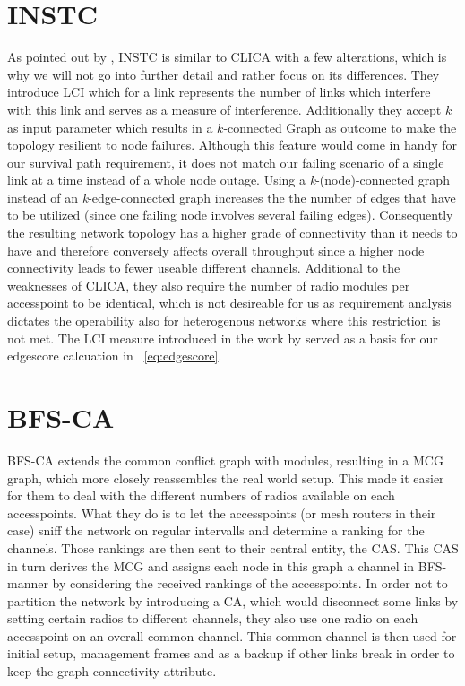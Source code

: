   \section{\ac{INSTC}}
    As pointed out by \cite{overview_caa}, INSTC \cite{INSTC} is similar to \ac{CLICA} with a few alterations, 
    which is why we will not go into further detail and rather focus on its differences. 
    They introduce \ac{LCI} which for a link represents the number of links which interfere with this link \cite{overview_caa} and serves as a measure of 
    interference. Additionally they accept \(k\) as input parameter which results in a \(k\)-connected Graph as outcome to make the topology resilient to node failures.
    Although this feature would come in handy for our survival path requirement, it does not match our failing scenario of a single link at a time instead of a whole node outage.
    Using a \textit{k}-(node)-connected graph instead of an \textit{k}-edge-connected graph increases the the number of edges that have to be utilized 
    (since one failing node involves several failing edges). Consequently the resulting network topology has a higher grade of connectivity than it needs to 
    have and therefore conversely affects overall throughput since a higher node connectivity leads to fewer useable different channels. 
    Additional to the weaknesses of \ac{CLICA}, they also require the number of radio modules per accesspoint to be identical, 
    which is not desireable for us as requirement analysis dictates the operability also for heterogenous networks where this
    restriction is not met. The LCI measure introduced in the work by \cite{INSTC} served as a basis for our edgescore calcuation in ~\ref{eq:edgescore}.
    
  \section{\ac{BFS-CA}}
    \ac{BFS-CA} \cite{BFS-CA} extends the common conflict graph with modules, resulting in a \ac{MCG} graph, which more closely reassembles the
    real world setup. This made it easier for them to deal with the different numbers of radios available on each accesspoints. 
    What they do is to let the accesspoints (or mesh routers in their case) sniff the network on regular intervalls and determine a ranking for the channels.
    Those rankings are then sent to their central entity, the \ac{CAS}. This \ac{CAS} in turn derives the \ac{MCG} and assigns each node in this graph 
    a channel in \ac{BFS}-manner by considering the received rankings of the accesspoints. In order not to partition the network by introducing a \ac{CA}, which 
    would disconnect some links by setting certain radios to different channels, they also use one radio on each accesspoint on an overall-common channel.
    This common channel is then used for initial setup, management frames and as a backup if other links break in order to keep the graph connectivity attribute.
    

